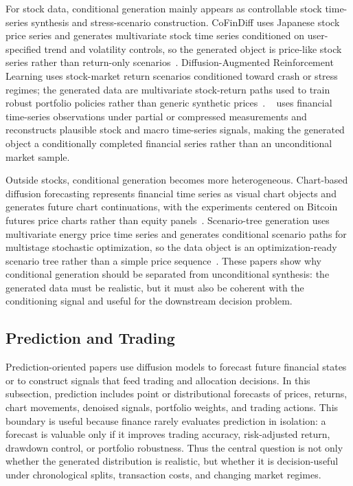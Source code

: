 \documentclass[sigconf,nonacm]{acmart}
\begin{document}
For stock data, conditional generation mainly appears as controllable stock
time-series synthesis and stress-scenario construction. CoFinDiff uses Japanese
stock price series and generates multivariate stock time series conditioned on
user-specified trend and volatility controls, so the generated object is
price-like stock series rather than return-only scenarios~\cite{tanaka2025cofindiff}.
Diffusion-Augmented Reinforcement Learning uses stock-market return scenarios
conditioned toward crash or stress regimes; the generated data are multivariate
stock-return paths used to train robust portfolio policies rather than generic
synthetic prices~\cite{choudhary2025diffaugrl}. ~\citet{guo2025compressedsensing} uses financial time-series observations under partial or
compressed measurements and reconstructs plausible stock and macro time-series
signals, making the generated object a conditionally completed financial series
rather than an unconditional market sample.

Outside stocks, conditional generation becomes more heterogeneous. Chart-based
diffusion forecasting represents financial time series as visual chart objects
and generates future chart continuations, with the experiments centered on
Bitcoin futures price charts rather than equity panels~\cite{lee2025charts}.
Scenario-tree generation uses multivariate energy price time series and generates
conditional scenario paths for multistage stochastic optimization, so the data
object is an optimization-ready scenario tree rather than a simple price
sequence~\cite{zarifis2025scenariotree}. These papers show why conditional
generation should be separated from unconditional synthesis: the generated data
must be realistic, but it must also be coherent with the conditioning signal and
useful for the downstream decision problem.

\subsection{Prediction and Trading}\label{sec:fts-decision}

Prediction-oriented papers use diffusion models to forecast future financial
states or to construct signals that feed trading and allocation decisions. In
this subsection, prediction includes point or distributional forecasts of prices,
returns, chart movements, denoised signals, portfolio weights, and trading
actions. This boundary is useful because finance rarely evaluates prediction in
isolation: a forecast is valuable only if it improves trading accuracy,
risk-adjusted return, drawdown control, or portfolio robustness. Thus the central
question is not only whether the generated distribution is realistic, but whether
it is decision-useful under chronological splits, transaction costs, and changing
market regimes.
\end{document}
